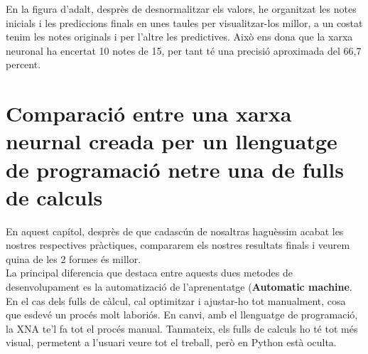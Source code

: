 En la figura d'adalt, desprès de desnormalitzar els valors, he organitzat les notes inicials i les prediccions finals en unes taules per visualitzar-los millor, a un costat tenim les notes originals i per l'altre les predictives.
 Això ens dona que la xarxa neuronal ha encertat 10 notes de 15, per tant té una precisió aproximada del 66,7 percent.

\section{Comparació entre una xarxa neurnal creada per un llenguatge de programació netre una de fulls de calculs}
En aquest capítol, desprès de que cadascún de nosaltras haguèssim acabat les nostres respectives pràctiques, compararem els nostres resultats finals i veurem quina de les 2 formes és millor.\\

La principal diferencia que destaca entre aquests dues metodes de desenvolupament es la automatizació de l'aprenentatge (\textbf{Automatic machine}. En el cas dels fulls de càlcul, cal optimitzar i ajustar-ho tot manualment, cosa que esdevé un procés molt laboriós. En canvi, amb el llenguatge de programació, la XNA te'l fa tot el procés manual. Tanmateix, els fulls de calculs ho té tot més visual, permetent a l'usuari veure tot el treball, però en Python està oculta.\\

